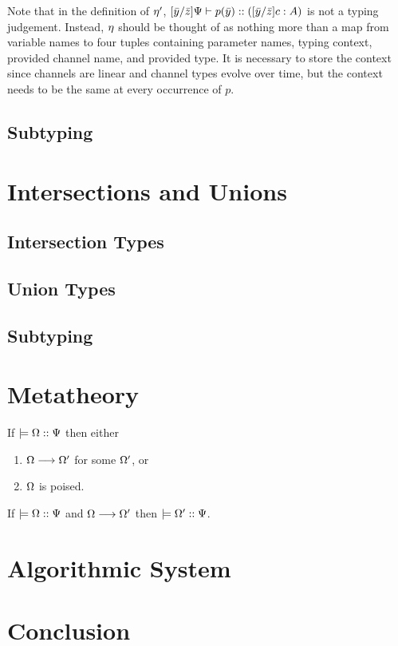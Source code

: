 \documentclass[a4paper,USenglish]{lipics-v2016}
\begin{document}
Note that in the definition of $\eta'$, $\lbrack{\bar{y}}/{\bar{z}}\rbrack{\Psi} \vdash {p}(\bar{y}) :: (\lbrack{\bar{y}}/{\bar{z}}\rbrack{c} : A)$ is not a typing judgement. Instead, $\eta$ should be thought of as nothing more than a map from variable names to four tuples containing parameter names, typing context, provided channel name, and provided type. It is necessary to store the context since channels are linear and channel types evolve over time, but the context needs to be the same at every occurrence of $p$.


\subsection{Subtyping}




\section{Intersections and Unions}
\label{refinements}

  \subsection{Intersection Types}

  \subsection{Union Types}

  \subsection{Subtyping}


\section{Metatheory}
\label{metatheory}

\begin{theorem}[Progress]
If $\models {\Omega} :: {\Psi}$ then either
\begin{enumerate}
  \item $\Omega \longrightarrow \Omega'$ for some $\Omega'$, or
  \item $\Omega$ is poised.
\end{enumerate}
\end{theorem}


\begin{theorem}[Preservation]
If $\models {\Omega} :: {\Psi}$ and $\Omega \longrightarrow \Omega'$ then $\models {\Omega'} :: {\Psi}$.
\end{theorem}


\section{Algorithmic System}
\label{algorithmic}


\section{Conclusion}
\label{conclusion}


\appendix





\end{document}
